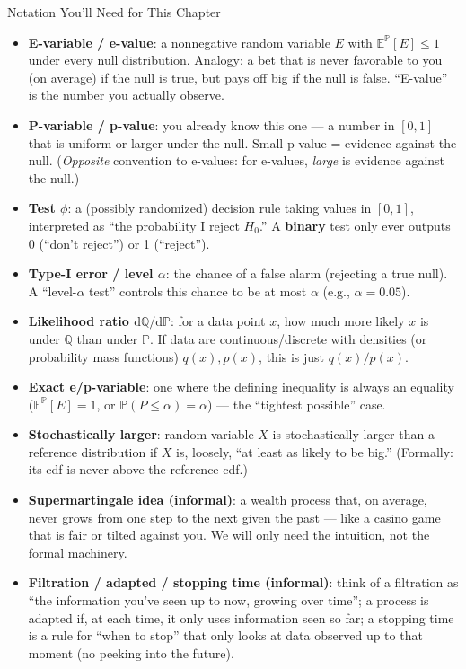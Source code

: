 \documentclass[aspectratio=169,10pt]{beamer}
\begin{document}
\begin{frame}[allowframebreaks]{Notation You'll Need for This Chapter}
\begin{itemize}
  \item \textbf{E-variable / e-value}: a nonnegative random variable $E$
    with $\mathbb{E}^{\mathbb{P}}[E]\le 1$ under every null distribution.
    Analogy: a bet that is never favorable to you (on average) if the null
    is true, but pays off big if the null is false. ``E-value'' is the
    number you actually observe.
  \item \textbf{P-variable / p-value}: you already know this one --- a
    number in $[0,1]$ that is uniform-or-larger under the null. Small
    p-value = evidence against the null. (\emph{Opposite} convention to
    e-values: for e-values, \emph{large} is evidence against the null.)
  \item \textbf{Test $\phi$}: a (possibly randomized) decision rule taking
    values in $[0,1]$, interpreted as ``the probability I reject $H_0$.''
    A \textbf{binary} test only ever outputs 0 (``don't reject'') or 1
    (``reject'').
  \item \textbf{Type-I error / level $\alpha$}: the chance of a false alarm
    (rejecting a true null). A ``level-$\alpha$ test'' controls this chance
    to be at most $\alpha$ (e.g., $\alpha = 0.05$).
  \item \textbf{Likelihood ratio $\mathrm{d}\mathbb{Q}/\mathrm{d}\mathbb{P}$}:
    for a data point $x$, how much more likely $x$ is under $\mathbb{Q}$
    than under $\mathbb{P}$. If data are continuous/discrete with densities
    (or probability mass functions) $q(x), p(x)$, this is just $q(x)/p(x)$.

\framebreak

  \item \textbf{Exact e/p-variable}: one where the defining inequality is
    always an equality ($\mathbb{E}^{\mathbb{P}}[E]=1$, or
    $\mathbb{P}(P\le\alpha)=\alpha$) --- the ``tightest possible'' case.
  \item \textbf{Stochastically larger}: random variable $X$ is stochastically
    larger than a reference distribution if $X$ is, loosely, ``at least as
    likely to be big.'' (Formally: its cdf is never above the reference cdf.)
  \item \textbf{Supermartingale idea (informal)}: a wealth process that, on
    average, never grows from one step to the next given the past --- like
    a casino game that is fair or tilted against you. We will only need the
    intuition, not the formal machinery.
  \item \textbf{Filtration / adapted / stopping time (informal)}: think of a
    filtration as ``the information you've seen up to now, growing over
    time''; a process is adapted if, at each time, it only uses information
    seen so far; a stopping time is a rule for ``when to stop'' that only
    looks at data observed up to that moment (no peeking into the future).


\end{itemize}
\end{frame}
\end{document}
